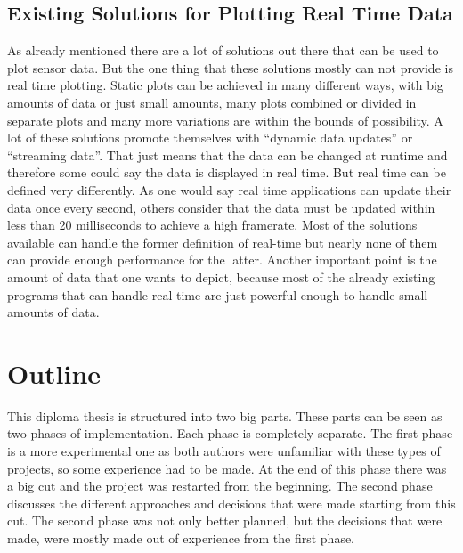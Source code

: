 \subsection{Existing Solutions for Plotting Real Time Data}

As already mentioned there are a lot of solutions out there that can be used to plot sensor data. But the one thing that these solutions mostly can not provide is real time plotting. Static plots can be achieved in many different ways, with big amounts of data or just small amounts, many plots combined or divided in separate plots and many more variations are within the bounds of possibility. A lot of these solutions promote themselves with ``dynamic data updates'' or ``streaming data''. That just means that the data can be changed at runtime and therefore some could say the data is displayed in real time. But real time can be defined very differently. As one would say real time applications can update their data once every second, others consider that the data must be updated within less than 20 milliseconds to achieve a high framerate. Most of the solutions available can handle the former definition of real-time but nearly none of them can provide enough performance for the latter. Another important point is the amount of data that one wants to depict, because most of the already existing programs that can handle real-time are just powerful enough to handle small amounts of data.

\section{Outline}


This diploma thesis is structured into two big parts. These parts can be seen as two phases of implementation. Each phase is completely separate. The first phase is a more experimental one as both authors were unfamiliar with these types of projects, so some experience had to be made. At the end of this phase there was a big cut and the project was restarted from the beginning. The second phase discusses the different approaches and decisions that were made starting from this cut. The second phase was not only better planned, but the decisions that were made, were mostly made out of experience from the first phase.
